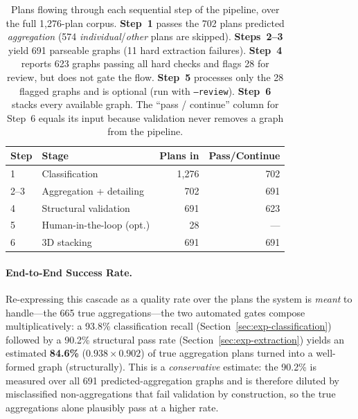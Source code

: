 \documentclass[12pt,a4paper,openright]{report}
\newcommand{\code}[1]{\texttt{#1}}
\begin{document}
\begin{table}[ht]
\centering
\begin{tabular}{@{}llrr@{}}
\toprule
\textbf{Step} & \textbf{Stage} & \textbf{Plans in} & \textbf{Pass/Continue} \\
\midrule
1 & Classification             & 1{,}276 & 702 \\
2--3 & Aggregation + detailing & 702 & 691 \\
4 & Structural validation      & 691 & 623 \\
5 & Human-in-the-loop (opt.)   & 28  & --- \\
6 & 3D stacking                & 691 & 691 \\
\bottomrule
\end{tabular}
\caption{Plans flowing through each sequential step of the pipeline, over the
full 1{,}276-plan corpus. \textbf{Step~1} passes the 702 plans predicted
\textit{aggregation} (574 \textit{individual}/\textit{other} plans are skipped).
\textbf{Steps~2--3} yield 691 parseable graphs (11 hard extraction failures).
\textbf{Step~4} reports 623 graphs passing all hard checks and flags 28 for
review, but does not gate the flow. \textbf{Step~5} processes only the 28
flagged graphs and is optional (run with \code{--review}). \textbf{Step~6}
stacks every available graph. The ``pass / continue'' column for Step~6 equals
its input because validation never removes a graph from the pipeline.}
\label{tab:stepfunnel}
\end{table}

\paragraph{End-to-End Success Rate.} Re-expressing this cascade as a quality rate over the plans the system is \emph{meant} to handle---the 665 true aggregations---the two automated gates compose multiplicatively: a 93.8\% classification recall (Section~\ref{sec:exp-classification}) followed by a 90.2\% structural pass rate (Section~\ref{sec:exp-extraction}) yields an
estimated \textbf{84.6\%} ($0.938 \times 0.902$) of true aggregation plans turned into a well-formed graph (structurally). This is a \emph{conservative} estimate: the 90.2\% is measured over all 691 predicted-aggregation graphs and is therefore diluted by misclassified non-aggregations that fail validation by construction, so the true aggregations alone plausibly pass at a higher rate.
\end{document}
